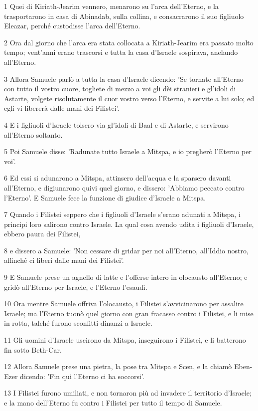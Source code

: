 \par 1 Quei di Kiriath-Jearim vennero, menarono su l'arca dell'Eterno, e la trasportarono in casa di Abinadab, sulla collina, e consacrarono il suo figliuolo Eleazar, perché custodisse l'arca dell'Eterno.
\par 2 Ora dal giorno che l'arca era stata collocata a Kiriath-Jearim era passato molto tempo; vent'anni erano trascorsi e tutta la casa d'Israele sospirava, anelando all'Eterno.
\par 3 Allora Samuele parlò a tutta la casa d'Israele dicendo: 'Se tornate all'Eterno con tutto il vostro cuore, togliete di mezzo a voi gli dèi stranieri e gl'idoli di Astarte, volgete risolutamente il cuor vostro verso l'Eterno, e servite a lui solo; ed egli vi libererà dalle mani dei Filistei'.
\par 4 E i figliuoli d'Israele tolsero via gl'idoli di Baal e di Astarte, e servirono all'Eterno soltanto.
\par 5 Poi Samuele disse: 'Radunate tutto Israele a Mitspa, e io pregherò l'Eterno per voi'.
\par 6 Ed essi si adunarono a Mitspa, attinsero dell'acqua e la sparsero davanti all'Eterno, e digiunarono quivi quel giorno, e dissero: 'Abbiamo peccato contro l'Eterno'. E Samuele fece la funzione di giudice d'Israele a Mitspa.
\par 7 Quando i Filistei seppero che i figliuoli d'Israele s'erano adunati a Mitspa, i principi loro salirono contro Israele. La qual cosa avendo udita i figliuoli d'Israele, ebbero paura dei Filistei,
\par 8 e dissero a Samuele: 'Non cessare di gridar per noi all'Eterno, all'Iddio nostro, affinché ci liberi dalle mani dei Filistei'.
\par 9 E Samuele prese un agnello di latte e l'offerse intero in olocausto all'Eterno; e gridò all'Eterno per Israele, e l'Eterno l'esaudì.
\par 10 Ora mentre Samuele offriva l'olocausto, i Filistei s'avvicinarono per assalire Israele; ma l'Eterno tuonò quel giorno con gran fracasso contro i Filistei, e li mise in rotta, talché furono sconfitti dinanzi a Israele.
\par 11 Gli uomini d'Israele uscirono da Mitspa, inseguirono i Filistei, e li batterono fin sotto Beth-Car.
\par 12 Allora Samuele prese una pietra, la pose tra Mitspa e Scen, e la chiamò Eben-Ezer dicendo: 'Fin qui l'Eterno ci ha soccorsi'.
\par 13 I Filistei furono umiliati, e non tornaron più ad invadere il territorio d'Israele; e la mano dell'Eterno fu contro i Filistei per tutto il tempo di Samuele.
